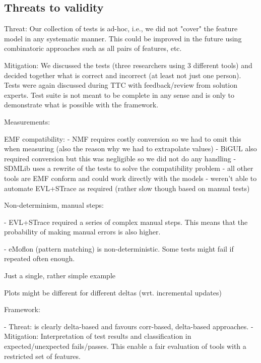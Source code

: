 \subsection{Threats to validity}
\label{sec:ThreatsToValidity}


Threat:  Our collection of tests is ad-hoc, i.e., we did not "cover" the feature model in any systematic manner.  This could be improved in the future using combinatoric approaches such as all pairs of features, etc.   

Mitigation:  We discussed the tests (three researchers using 3 different tools) and decided together what is correct and incorrect (at least not just one person).  Tests were again discussed during TTC with feedback/review from solution experts.  Test suite is not meant to be complete in any sense and is only to demonstrate what is possible with the framework.

Measurements:  

EMF compatibility:
- NMF requires costly conversion so we had to omit this when measuring (also the reason why we had to extrapolate values)
- BiGUL also required conversion but this was negligible so we did not do any handling
- SDMLib uses a rewrite of the tests to solve the compatibility problem
- all other tools are EMF conform and could work directly with the models
- weren't able to automate EVL+STrace as required (rather slow though based on manual tests)

Non-determinism, manual steps:

- EVL+STrace required a series of complex manual steps.  This means that the probability of making manual errors is also higher.

- eMoflon (pattern matching) is non-deterministic.  Some tests might fail if repeated often enough.

Just a single, rather simple example

Plots might be different for different deltas (wrt. incremental updates)

Framework:

- Threat: is clearly delta-based and favours corr-based, delta-based approaches. 
- Mitigation:  Interpretation of test results and classification in expected/unexpected fails/passes.  This enable a fair evaluation of tools with a restricted set of features.

